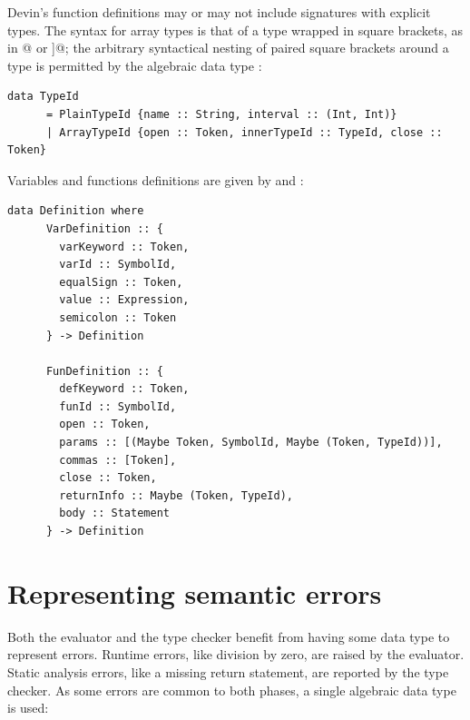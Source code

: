 \documentclass[UdineBachThesis,american,11pt]{PhdThesis}
\begin{document}
  Devin's function definitions may or may not include signatures with explicit
  types. The syntax for array types is that of a type wrapped in square
  brackets, as in \lstinline@[Int]@ or \lstinline@[[Float]]@; the arbitrary
  syntactical nesting of paired square brackets around a type is permitted by
  the algebraic data type \lstinline@TypeId@:

  \begin{lstlisting}[gobble=4,basicstyle=\ttfamily\small]
    data TypeId
      = PlainTypeId {name :: String, interval :: (Int, Int)}
      | ArrayTypeId {open :: Token, innerTypeId :: TypeId, close :: Token}
  \end{lstlisting}

  Variables and functions definitions are given by \lstinline@VarDefinition@ and
  \lstinline@FunDefinition@:

  \begin{lstlisting}[gobble=4,basicstyle=\ttfamily\small]
    data Definition where
      VarDefinition :: {
        varKeyword :: Token,
        varId :: SymbolId,
        equalSign :: Token,
        value :: Expression,
        semicolon :: Token
      } -> Definition

      FunDefinition :: {
        defKeyword :: Token,
        funId :: SymbolId,
        open :: Token,
        params :: [(Maybe Token, SymbolId, Maybe (Token, TypeId))],
        commas :: [Token],
        close :: Token,
        returnInfo :: Maybe (Token, TypeId),
        body :: Statement
      } -> Definition
  \end{lstlisting}

  \newpage

  \section{Representing semantic errors}

  Both the evaluator and the type checker benefit from having some data type to
  represent errors. Runtime errors, like division by zero, are raised by the
  evaluator. Static analysis errors, like a missing return statement, are
  reported by the type checker. As some errors are common to both phases, a
  single algebraic data type is used:
\end{document}
